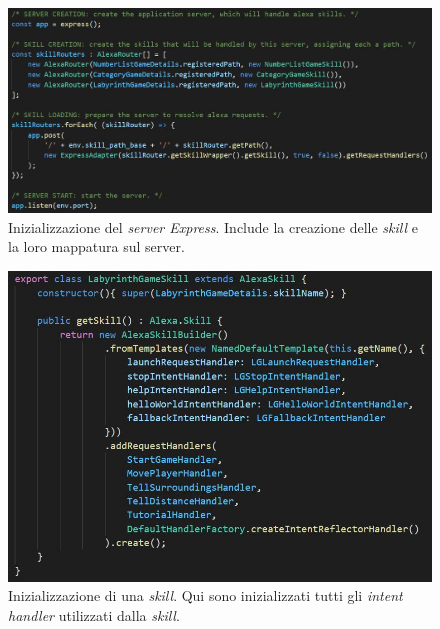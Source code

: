 \begin{figure}[!ht]
  \centering
  \includegraphics[scale=0.52]{resources/images/implementation/code/server-start-code-example.jpg}
  \caption{
    Inizializzazione del \textit{server Express}. Include la creazione delle
    \textit{skill} e la loro mappatura sul server.
  }
  \label{fig:figure5.8}
\end{figure}

\begin{figure}[!ht]
  \centering
  \includegraphics[scale=0.52]{resources/images/implementation/code/skill-code-example.jpg}
  \caption{
    Inizializzazione di una \textit{skill}. Qui sono inizializzati tutti
    gli \textit{intent handler} utilizzati dalla \textit{skill}.
  }
  \label{fig:figure5.9}
\end{figure}

